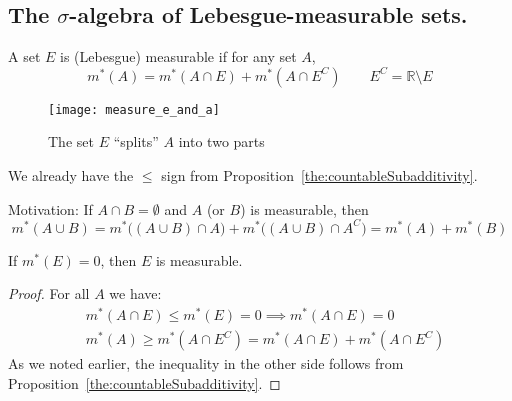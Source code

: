 \subsection{The $\sigma$-algebra of Lebesgue-measurable sets.}
\begin{definition}
    A set $E$ is (Lebesgue) measurable if for any set 
    $A$,
    \[ 
        m^*(A) = m^*(A \cap E) + m^*(A \cap E^{C})
        \qquad E^C = \mathbb{R} \setminus E
    \]
    \begin{figure*}[h]
        \centering
        \texttt{[image: measure\_e\_and\_a]}
        \caption{The set $E$ ``splits'' $A$ into two parts}
    \end{figure*}
\end{definition}
\begin{remark}
    We already have the $\le$ sign from Proposition~\ref{the:countableSubadditivity}.
\end{remark}
\begin{remark}
    Motivation: If $A \cap B = \emptyset$ and $A$ (or $B$) is measurable, then
    \[
        m^*(A \cup B) = m^*\bigl((A \cup B) \cap A\bigr) +
        m^*\bigl( (A \cup B)  \cap A^C \bigr) = m^*(A) + m^*(B)
    \]
\end{remark}

\begin{proposition}
    If $m^*(E) = 0$, then $E$ is measurable.
\end{proposition}
\begin{proof}
    For all $A$ we have:
    \begin{align*}
        &
        m^*(A \cap E) \le m^*(E) = 0 \implies m^*(A \cap E) = 0
        \\&
        m^*(A) \ge m^*(A \cap E^C) = m^*(A \cap E) + m^*(A \cap E^C)
    \end{align*}
    As we noted earlier, the inequality in the other side follows from 
    Proposition~\ref{the:countableSubadditivity}.
\end{proof}

